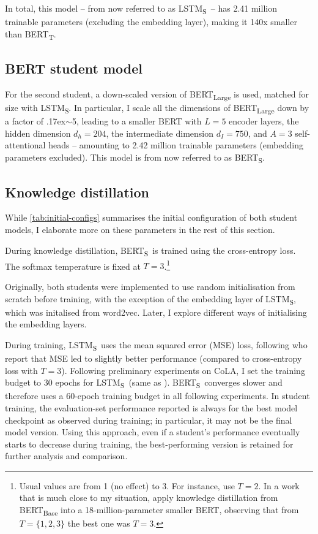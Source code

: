 \documentclass[bsc,frontabs,singlespacing,parskip,deptreport]{infthesis}
\def\mytilde{{\raise.17ex\hbox{$\scriptstyle\sim$}}}
\def\BERTT{BERT\textsubscript{T}}
\def\BERTS{BERT\textsubscript{S}}
\def\LSTMS{LSTM\textsubscript{S}}
\begin{document}
{{{      In total, this model -- from now referred to as \LSTMS~-- has 2.41 million trainable parameters (excluding the embedding layer), making it 140x smaller than \BERTT.
    }

    \subsection{BERT student model}{
      For the second student, a down-scaled version of BERT\textsubscript{Large} is used, matched for size with \LSTMS. In particular, I scale all the dimensions of BERT\textsubscript{Large} down by a factor of \mytilde5, leading to a smaller BERT with $L=5$ encoder layers, the hidden dimension $d_h=204$, the intermediate dimension $d_I=750$, and $A=3$ self-attentional heads -- amounting to 2.42 million trainable parameters (embedding parameters excluded). This model is from now referred to as \BERTS.
    }

    \subsection{Knowledge distillation}{
      While \autoref{tab:initial-configs} summarises the initial configuration of both student models, I elaborate more on these parameters in the rest of this section.

      During knowledge distillation, \BERTS~is trained using the cross-entropy loss. The softmax temperature is fixed at $T=3$.\footnote{Usual values are from 1 (no effect) to 3. For instance, \citet{Sanh_2019} use $T=2$. In a work that is much close to my situation, \citet{Tsai_2019} apply knowledge distillation from BERT\textsubscript{Base} into a 18-million-parameter smaller BERT, observing that from $T=\{1, 2, 3\}$ the best one was $T=3$.}
      
      Originally, both students were implemented to use random initialisation from scratch before training, with the exception of the embedding layer of \LSTMS, which was initalised from word2vec. Later, I explore different ways of initialising the embedding layers.
      
      During training, \LSTMS~uses the mean squared error (MSE) loss, following \citeauthor{Tang_2019b} who report that MSE led to slightly better performance (compared to cross-entropy loss with $T=3$). Following preliminary experiments on CoLA, I set the training budget to 30 epochs for \LSTMS~(same as \citeauthor{Tang_2019b}). \BERTS~converges slower and therefore uses a 60-epoch training budget in all following experiments. In student training, the evaluation-set performance reported is always for the best model checkpoint as observed during training; in particular, it may not be the final model version.
      Using this approach, even if a student's performance eventually starts to decrease during training, the best-performing version is retained for further analysis and comparison.

}}}
\end{document}
